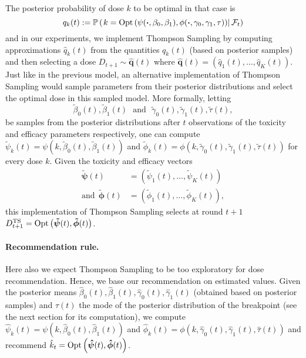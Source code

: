 The posterior probability of dose $k$ to be optimal in that case is 
\[{q}_k(t) := \mathbb{P}\left( \left.k = \mathrm{Opt}\left( \psi(\bm\cdot, \beta_0,\beta_1),\phi(\bm\cdot, \gamma_0,\gamma_1,\tau)\right) \right|\mathcal{F}_{t}\right)\]
and in our experiments, we implement Thompson Sampling by computing approximations $\hat{q}_k(t)$ from the quantities $q_k(t)$ (based on posterior samples) and then selecting a dose $D_{t+1}\sim \bm{\hat{q}}(t)$ where  $\bm{\hat{q}}(t) = (\hat{q}_1(t),\dots,\hat{q}_K(t))$. Just like in the previous model, an alternative implementation of Thompson Sampling would sample parameters from their posterior distributions and select the optimal dose in this sampled model. More formally, letting 
\begin{equation}\tilde{\beta}_0(t), \tilde{\beta}_1(t) \ \ \ \text{and} \ \ \ \tilde{\gamma}_0(t), \tilde{\gamma}_1(t), \tilde{\tau}(t),\label{eq:PosteriorSamples}\end{equation}
be samples from the posterior distributions after $t$ observations of the toxicity and efficacy parameters respectively, one can compute $\tilde{\psi}_k(t) = \psi(k,\tilde{\beta}_0(t),\tilde{\beta}_1(t))$ and $\tilde{\phi}_k(t) = \phi(k,\tilde{\gamma}_0(t),\tilde{\gamma}_1(t),\tilde{\tau}(t))$ for every dose $k$. Given the toxicity and efficacy vectors  
\begin{align*}
\bm{\tilde{\psi}}(t) &= \left(\tilde{\psi}_1(t),\dots,\tilde{\psi}_K(t)\right)
\\
\text{and} \ \ \bm {\tilde{\phi}}(t) &= \left(\tilde{\phi}_1(t),\dots,\tilde{\phi}_K(t)\right),
\end{align*}
this implementation of Thompson Sampling selects at round $t+1$ $D_{t+1}^{\text{TS}} = \mathrm{Opt}\left(\bm{\tilde{\psi}}(t), \bm{\tilde{\phi}}(t)\right)$.

\paragraph{Recommendation rule.}Here also we expect Thompson Sampling to be too exploratory for dose recommendation. Hence, we base our recommendation on estimated values. Given the posterior means 
$\hat{\beta}_0(t), \hat{\beta}_1(t),\hat{\gamma}_0(t),\hat{\gamma}_1(t)$ (obtained based on posterior samples) and $\hat{\tau}(t)$ the mode of the posterior distribution of the breakpoint (see the next section for its computation), we compute  
$\hat{\psi}_k(t) = \psi(k,\hat{\beta}_0(t),\hat{\beta}_1(t))$ and $\hat{\phi}_k(t) = \phi(k,\hat{\gamma}_0(t),\hat{\gamma}_1(t),\hat{\tau}(t))$ and recommend $\hat{k}_t = \mathrm{Opt}\left(\bm{\hat{\psi}}(t), \bm{\hat{\phi}}(t)\right)$.



